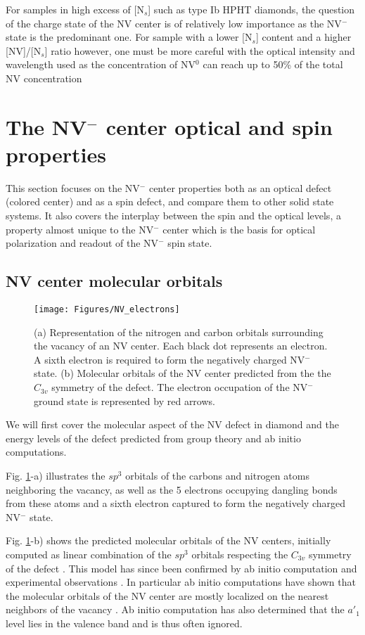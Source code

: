 \documentclass[a4paper,11pt]{report}
\begin{document}
For samples in high excess of [N$_s$] such as type Ib HPHT diamonds, the question of the charge state of the NV center is of relatively low importance as the NV$^-$ state is the predominant one. For sample with a lower [N$_s$] content and a higher [NV]/[N$_s$] ratio however, one must be more careful with the optical intensity and wavelength used as the concentration of NV$^0$ can reach up to 50\% of the total NV concentration \citep{grezes2015storage}

\section{The NV$^-$ center optical and spin properties}

This section focuses on the NV$^-$ center properties both as an optical defect (colored center) and as a spin defect, and compare them to other solid state systems. It also covers the interplay between the spin and the optical levels, a property almost unique to the NV$^-$ center which is the basis for optical polarization and readout of the NV$^-$ spin state.

\subsection{NV center molecular orbitals}

\begin{figure}[h!]
\centering
\texttt{[image: Figures/NV\_electrons]}
\caption{(a) Representation of the nitrogen and carbon orbitals surrounding the vacancy of an NV center. Each black dot represents an electron. A sixth electron is required to form the negatively charged NV$^-$ state. (b) Molecular orbitals of the NV center predicted from the the $C_{3v}$ symmetry of the defect. The electron occupation of the NV$^-$ ground state is represented by red arrows.}
\label{NV electrons}
\end{figure}

We will first cover the molecular aspect of the NV defect in diamond and the energy levels of the defect predicted from group theory and ab initio computations.

Fig. \ref{NV electrons}-a) illustrates the $sp^3$ orbitals of the carbons and nitrogen atoms neighboring the vacancy, as well as the 5 electrons occupying dangling bonds from these atoms and a sixth electron captured to form the negatively charged NV$^-$ state. 

Fig. \ref{NV electrons}-b) shows the predicted molecular orbitals of the NV centers, initially computed as linear combination of the $sp^3$ orbitals respecting the $C_{3v}$ symmetry of the defect \citep{loubser1978electron}. This model has since been confirmed by ab initio computation and experimental observations \citep{doherty2013nitrogen}. In particular ab initio computations have shown that the molecular orbitals of the NV center are mostly localized on the nearest neighbors of the vacancy \citep{gali2008ab}. Ab initio computation has also determined that the $a'_1$ level lies in the valence band and is thus often ignored.
\end{document}

